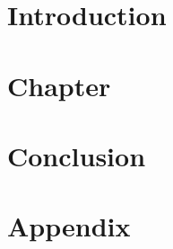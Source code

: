 \providecommand{\main}{.}






{\hypersetup{hidelinks}
	\tableofcontents  %
}

\chapter{Introduction}


\chapter{Chapter}


\chapter{Conclusion}


\appendix
\chapter{Appendix}





